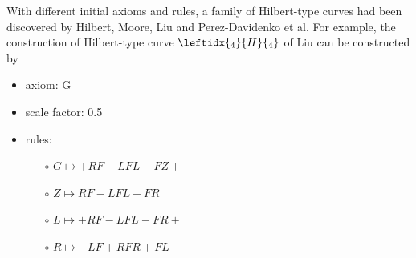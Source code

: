 \documentclass{article}
\begin{document}
With different initial axioms and rules, a family of Hilbert-type curves had been discovered by Hilbert, Moore,
Liu and Perez-Davidenko et al. For example, the construction of Hilbert-type curve $\leftidx{_4}{H}{_4}$ of Liu
can be constructed by

\begin{itemize}
  \item axiom: G
  \item scale factor: 0.5
  \item rules: \begin{itemize}
      \item[$\circ$] $G \mapsto +RF-LFL-FZ+ $
      \item[$\circ$] $Z \mapsto RF-LFL-FR $
      \item[$\circ$] $L \mapsto +RF-LFL-FR+ $
      \item[$\circ$] $R \mapsto -LF+RFR+FL- $
  \end{itemize}
\end{itemize}

\end{document}
